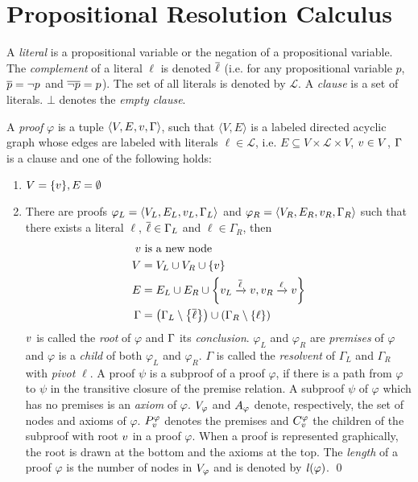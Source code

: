 \section{Propositional Resolution Calculus}
\label{sec:Resolution}

A \emph{literal} is a propositional variable or the negation of a propositional variable. The
\emph{complement} of a literal $\ell$ is denoted $\overline{\ell}$ (i.e. for any propositional variable $p$,
$\overline{p} = \neg p$ and $\overline{\neg p} = p$). The set of all literals is denoted by $\mathcal{L}$. A
\emph{clause} is a set of literals. $\bot$ denotes the \emph{empty clause}.


\begin{definition}[Proof] 
\label{def:proof}
A \emph{proof} $\varphi$ is a tuple $\langle V,E,v,\Gamma \rangle$, 
such that $\langle V,E \rangle$ is a labeled directed acyclic graph whose edges are labeled with literals $\ell \in \mathcal{L}$, i.e. $E \subseteq V \times \mathcal{L} \times V$, $v \in V$, $\Gamma$ is a clause 
and one of the following holds:

\begin{enumerate}
	\item $V = \{v\}, E = \emptyset$
	\item \label{enum:resCase} There are proofs $\varphi_L = \langle V_L, E_L, v_L,\Gamma_L \rangle$ and $\varphi_R = \langle V_R, E_R, v_R, \Gamma_R \rangle$ such that there exists a literal
				$\ell$, $\overline{\ell} \in \Gamma_L$ and $\ell \in \Gamma_R$, then
	    \begin{align*}
			v & \text{ is a new node} \\
      V &= V_L \cup V_R \cup \{v \} \\
      E &= E_L \cup E_R \cup
                    \left\{v_L \xrightarrow{\overline{\ell}} v , v_R \xrightarrow{\ell} v \right\} \\
     \Gamma &= \left( \Gamma_L \setminus \left\{ \overline{\ell} \right\} \right) \cup \left( \Gamma_R
                    \setminus \left\{ \ell \right\} \right)
    \end{align*}
		$v$ is called the \emph{root} of $\varphi$ and $\Gamma$ its \emph{conclusion}.
		$\varphi_L$ and $\varphi_R$ are \emph{premises} of $\varphi$ and $\varphi$ is a \emph{child} of both $\varphi_L$ and $\varphi_R$.
		$\Gamma$ is called the \emph{resolvent} of $\Gamma_L$ and $\Gamma_R$ with \emph{pivot} $\ell$.
		A proof $\psi$ is a subproof of a proof $\varphi$, if there is a path from $\varphi$ to $\psi$ in the transitive closure of the premise relation.
		A subproof $\psi$ of $\varphi$ which has no premises is an \emph{axiom} of $\varphi$.
		$V_{\varphi}$ and $A_{\varphi}$ denote, respectively, the set of nodes and axioms of $\varphi$. $P_{v}^{\varphi}$ denotes the premises and $C_{v}^{\varphi}$ the children of the subproof with root $v$ in a proof $\varphi$. When a proof is represented graphically, the root is drawn at the bottom and the axioms at the top. The \emph{length} of a proof $\varphi$ is the number of nodes in $V_{\varphi}$ and is denoted by $\mathit{l}(\varphi)$.
\qed
\end{enumerate}

\end{definition}

